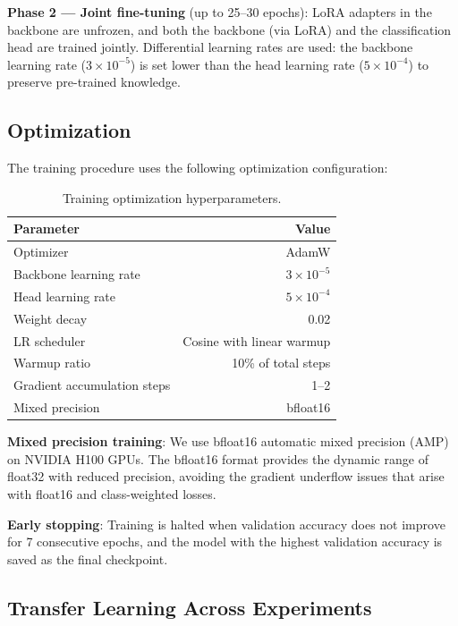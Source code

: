 \textbf{Phase 2 --- Joint fine-tuning} (up to 25--30 epochs): LoRA adapters in the backbone are unfrozen, and both the backbone (via LoRA) and the classification head are trained jointly. Differential learning rates are used: the backbone learning rate ($3 \times 10^{-5}$) is set lower than the head learning rate ($5 \times 10^{-4}$) to preserve pre-trained knowledge.

\subsection{Optimization}

The training procedure uses the following optimization configuration:

\begin{table}[htbp]
    \centering
    \caption{Training optimization hyperparameters.}
    \label{tab:training-config}
    \begin{tabular}{lr}
        \toprule
        \textbf{Parameter} & \textbf{Value} \\
        \midrule
        Optimizer & AdamW \\
        Backbone learning rate & $3 \times 10^{-5}$ \\
        Head learning rate & $5 \times 10^{-4}$ \\
        Weight decay & 0.02 \\
        LR scheduler & Cosine with linear warmup \\
        Warmup ratio & 10\% of total steps \\
        Gradient accumulation steps & 1--2 \\
        Mixed precision & bfloat16 \\
        \bottomrule
    \end{tabular}
\end{table}

\textbf{Mixed precision training}: We use bfloat16 automatic mixed precision (AMP) on NVIDIA H100 GPUs. The bfloat16 format provides the dynamic range of float32 with reduced precision, avoiding the gradient underflow issues that arise with float16 and class-weighted losses.

\textbf{Early stopping}: Training is halted when validation accuracy does not improve for 7 consecutive epochs, and the model with the highest validation accuracy is saved as the final checkpoint.

\subsection{Transfer Learning Across Experiments}

